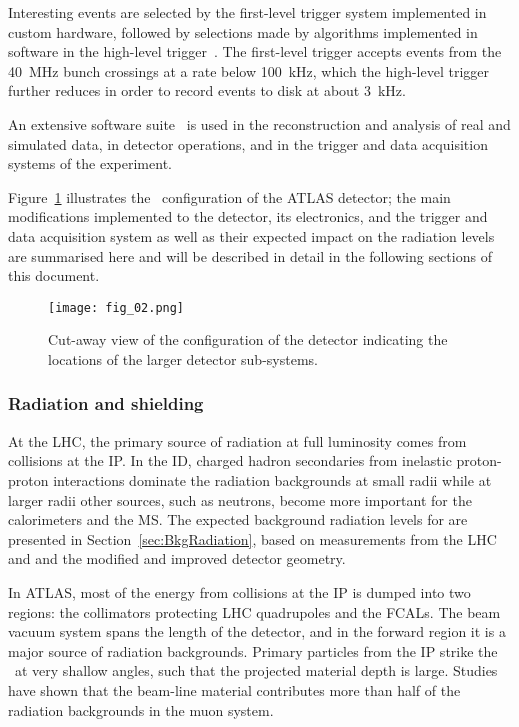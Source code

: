 \documentclass[cernpreprint, atlasdraft=false, UKenglish,british,orcidlogo, texmf, orcidlogo]{atlasdoc}
\begin{document}
Interesting events are selected by the first-level trigger system implemented in custom hardware,
followed by selections made by algorithms implemented in software in the high-level trigger~\cite{TRIG-2016-01}.
The first-level trigger accepts events from the \SI{40}{\MHz} bunch crossings at a rate below \SI{100}{\kHz},
which the high-level trigger further reduces in order to record events to disk at about \SI{3}{\kHz}.
 
An extensive software suite~\cite{ATL-SOFT-PUB-2021-001} is used in the reconstruction and analysis of real
and simulated data, in detector operations, and in the trigger and data acquisition systems of the experiment.
 
Figure~\ref{fig:Overview:ATLAS} illustrates the \RunThr\ configuration of the ATLAS detector; the main modifications implemented to the detector, its electronics, and the trigger and data acquisition system as well as their expected impact on the radiation levels are summarised here and will be described in detail in the following sections of this document.
 
\begin{figure}[t]
\centerline{\texttt{[image: fig\_02.png]}}
\caption{Cut-away view of the \RunThr configuration of the \ATLAS detector indicating the locations of the larger detector sub-systems.
\label{fig:Overview:ATLAS}}
\end{figure}
 
 
\subsubsection{Radiation and shielding}
 
At the \gls{LHC}, the primary source of radiation at full luminosity
comes from collisions at the \gls{IP}. In the \gls{ID}, charged hadron
secondaries from inelastic proton-proton interactions dominate the radiation
backgrounds at small radii while at larger radii other sources,
such as neutrons, become more important for the calorimeters and the \gls{MS}. The expected background radiation levels for \RunThr are presented in Section~\ref{sec:BkgRadiation}, based on measurements from the \gls{LHC} \RunOne and \RunTwo and the modified and improved detector geometry.
 
In ATLAS, most of the energy from collisions at the \gls{IP} is dumped into two regions: the
collimators protecting \gls{LHC} quadrupoles and the \glspl{FCAL}.
The beam vacuum system spans the length
of the detector, and in the forward region it is a major source of radiation backgrounds.
Primary particles from the \gls{IP} strike the \beampipe\ at very shallow angles,
such that the projected material depth is large. Studies have shown that the beam-line
material contributes more than half of the radiation backgrounds in the muon system.
 
\end{document}
